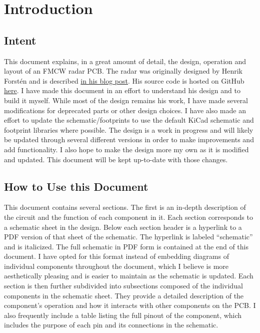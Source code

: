 \documentclass{default}
\begin{document}
\tableofcontents
\hypersetup{linkcolor=red}

\chapter{Introduction}
\label{cha:introduction}

\section{Intent}
\label{sec:intent}

This document explains, in a great amount of detail, the design, operation and layout of an FMCW radar PCB. The radar
was originally designed by Henrik Forst\'en and is described
\href{http://hforsten.com/third-version-of-homemade-6-ghz-fmcw-radar.html}{in his blog post}. His source code is hosted
on GitHub \href{https://github.com/Ttl/fmcw3}{here}. I have made this document in an effort to understand his design and
to build it myself. While most of the design remains his work, I have made several modifications for deprecated parts or
other design choices. I have also made an effort to update the schematic/footprints to use the default KiCad schematic
and footprint libraries where possible. The design is a work in progress and will likely be updated through several
different versions in order to make improvements and add functionality. I also hope to make the design more my own as it
is modified and updated. This document will be kept up-to-date with those changes.

\section{How to Use this Document}
\label{sec:how-to-use}

This document contains several sections. The first is an in-depth description of the circuit and the function of each
component in it. Each section corresponds to a schematic sheet in the design. Below each section header is a hyperlink
to a PDF version of that sheet of the schematic. The hyperlink is labeled ``schematic'' and is italicized. The full
schematic in PDF form is contained at the end of this document. I have opted for this format instead of embedding
diagrams of individual components throughout the document, which I believe is more aesthetically pleasing and is easier
to maintain as the schematic is updated. Each section is then further subdivided into subsections composed of the
individual components in the schematic sheet. They provide a detailed description of the component's operation and how
it interacts with other components on the PCB. I also frequently include a table listing the full pinout of the
component, which includes the purpose of each pin and its connections in the schematic.
\end{document}
